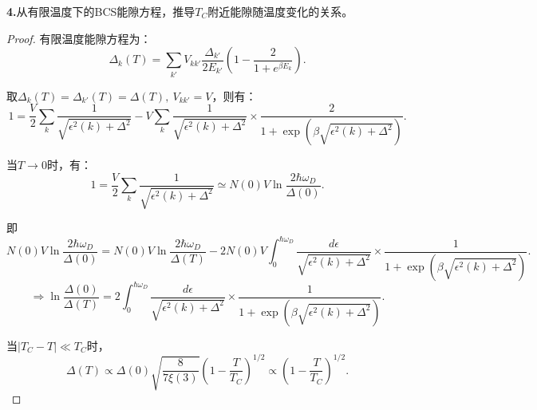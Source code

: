 \documentclass[reqno,a4paper,12pt]{amsart}
\begin{document}
\medskip

\textbf{4.}从有限温度下的BCS能隙方程，推导$T_C$附近能隙随温度变化的关系。
\begin{proof}
有限温度能隙方程为：
\[
	\Delta_k(T) = \sum_{k'} V_{kk'} \frac{\Delta_{k'}}{2E_{k'}} \left( 1- \frac{2}{1+e^{\beta E_k}} \right).
\]

取$\Delta_k(T) = \Delta_{k'}(T) = \Delta(T), \ V_{kk'} = V$，则有：
\[
	1 = \frac{V}{2} \sum_k \frac{1}{\sqrt{\epsilon^2(k) + \Delta^2}} - V \sum_k \frac{1}{\sqrt{\epsilon^2(k) + \Delta^2}} \times \frac{2}{1+\exp(\beta \sqrt{\epsilon^2(k) + \Delta^2})}.
\]

当$T\to 0$时，有：
\[
	1 = \frac{V}{2} \sum_k \frac{1}{\sqrt{\epsilon^2(k) + \Delta^2}} \simeq N(0)V \ln \frac{2\hbar\omega_D}{\Delta(0)}.
\]

即
\[
	N(0)V \ln \frac{2\hbar\omega_D}{\Delta(0)} = N(0)V \ln \frac{2\hbar\omega_D}{\Delta(T)} - 2N(0)V \int_0^{\hbar\omega_D} \frac{d\epsilon}{\sqrt{\epsilon^2(k) + \Delta^2}} \times \frac{1}{1+ \exp(\beta\sqrt{\epsilon^2(k) + \Delta^2})}.
\]
\[
	\Longrightarrow \ln \frac{\Delta(0)}{\Delta(T)} = 2\int_0^{\hbar\omega_D} \frac{d\epsilon}{\sqrt{\epsilon^2(k) + \Delta^2}} \times \frac{1}{1+ \exp(\beta\sqrt{\epsilon^2(k) + \Delta^2})}.
\]

当$\vert T_C - T \vert \ll T_C$时，
\[
	\Delta(T) \propto \Delta(0) \sqrt{\frac{8}{7\xi(3)}}\left( 1- \frac{T}{T_C} \right)^{1/2} \propto \left( 1- \frac{T}{T_C} \right)^{1/2}.
\]
\end{proof}
\end{document}
